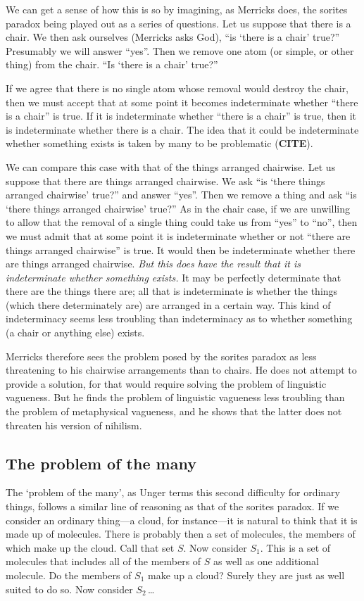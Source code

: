 \documentclass[11pt]{article}
\begin{document}
\begin{spacing}{1.5}
We can get a sense of how this is so by imagining, as Merricks does,
the sorites paradox being played out as a series of questions.  Let us
suppose that there is a chair.  We then ask ourselves (Merricks asks
God), ``is `there is a chair' true?''  Presumably we will answer
``yes''.  Then we remove one atom (or simple, or other thing) from the
chair.  ``Is `there is a chair' true?''

If we agree that there is no single atom whose removal would destroy
the chair, then we must accept that at some point it becomes
indeterminate whether ``there is a chair'' is true.  If it is
indeterminate whether ``there is a chair'' is true, then it is
indeterminate whether there is a chair.  The idea that it could be
indeterminate whether something exists is taken by many to be
problematic (\textbf{CITE}).

We can compare this case with that of the things arranged chairwise.
Let us suppose that there are things arranged chairwise.  We ask ``is
`there things arranged chairwise' true?'' and answer ``yes''.  Then we
remove a thing and ask ``is `there things arranged chairwise' true?''
As in the chair case, if we are unwilling to allow that the removal of
a single thing could take us from ``yes'' to ``no'', then we must
admit that at some point it is indeterminate whether or not ``there
are things arranged chairwise'' is true.  It would then be
indeterminate whether there are things arranged chairwise.  {\em But
  this does have the result that it is indeterminate whether something
  exists.}  It may be perfectly determinate that there are the things
there are; all that is indeterminate is whether the things (which
there determinately are) are arranged in a certain way.  This kind of
indeterminacy seems less troubling than indeterminacy as to whether
something (a chair or anything else) exists.

Merricks therefore sees the problem posed by the sorites paradox as
less threatening to his chairwise arrangements than to chairs.  He
does not attempt to provide a solution, for that would require solving
the problem of linguistic vagueness.  But he finds the problem of
linguistic vagueness less troubling than the problem of metaphysical
vagueness, and he shows that the latter does not threaten his version
of nihilism.

\subsection{The problem of the many}
\label{many}
The `problem of the many', as Unger terms this second difficulty for
ordinary things, follows a similar line of reasoning as that of the
sorites paradox.  If we consider an ordinary thing---a cloud, for
instance---it is natural to think that it is made up of molecules.
There is probably then a set of molecules, the members of which make
up the cloud.  Call that set $S$.  Now consider $S_1$.  This is a set
of molecules that includes all of the members of $S$ as well as one
additional molecule.  Do the members of $S_1$ make up a cloud?  Surely
they are just as well suited to do so.  Now consider $S_2$\,\ldots


\end{spacing}
\end{document}
